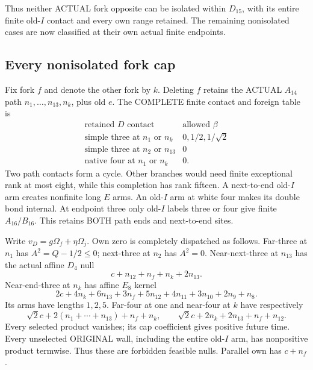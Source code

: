 Thus neither ACTUAL fork opposite can be isolated
within \(D_{15}\), with its entire finite old-\(I\)
contact and every own range retained.
The remaining nonisolated cases are now classified
at their own actual finite endpoints.

\subsection{Every nonisolated fork cap}
\label{app:arithD15Iforknonisolated}

Fix fork \(f\) and denote the other fork by \(k\).
Deleting \(f\) retains the ACTUAL \(A_{14}\) path
\(n_1,\ldots,n_{13},n_k\), plus old \(e\).
The COMPLETE finite contact and foreign table is
\[
\begin{array}{c|c}
 \text{retained }D\text{ contact}&\text{allowed }\beta\\ \hline
 \text{simple three at }n_1\text{ or }n_k&0,1/2,1/\sqrt2\\
 \text{simple three at }n_2\text{ or }n_{13}&0\\
 \text{native four at }n_1\text{ or }n_k&0.
\end{array}
\]
Two path contacts form a cycle.
Other branches would need finite exceptional rank
at most eight, while this completion has rank fifteen.
A next-to-end old-\(I\) arm creates nonfinite long
\(E\) arms.
An old-\(I\) arm at white four makes its double
bond internal.
At endpoint three only old-\(I\) labels three
or four give finite \(A_{16}/B_{16}\).
This retains BOTH path ends and next-to-end sites.

Write \(v_D=g\Omega_f+\eta\Omega_j\).
Own zero is completely dispatched as follows.
Far-three at \(n_1\) has \(A^2=Q-1/2\le0\);
next-three at \(n_2\) has \(A^2=0\).
Near-next-three at \(n_{13}\) has the actual affine
\(D_4\) null
\[
                       c+n_{12}+n_f+n_k+2n_{13}.
\]
Near-end-three at \(n_k\) has affine \(E_8\) kernel
\[
 2c+4n_k+6n_{13}+3n_f+5n_{12}
                 +4n_{11}+3n_{10}+2n_9+n_8 .
\]
Its arms have lengths \(1,2,5\).
Far-four at one and near-four at \(k\) have respectively
\[
 \sqrt2c+2(n_1+\cdots+n_{13})+n_f+n_k,\qquad
 \sqrt2c+2n_k+2n_{13}+n_f+n_{12}.
\]
Every selected product vanishes; its cap coefficient
gives positive future time.
Every unselected ORIGINAL wall, including the entire
old-\(I\) arm, has nonpositive product termwise.
Thus these are forbidden feasible nulls.
Parallel own has \(c+n_f\).

